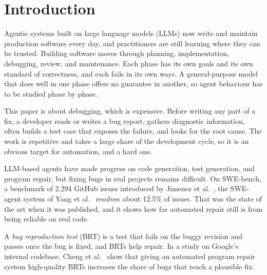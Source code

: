 \section{Introduction}
\label{sec:introduction}

Agentic systems built on large language models (LLMs) now write and maintain
production software every day, and practitioners are still learning where they
can be trusted. Building software moves through planning, implementation,
debugging, review, and maintenance. Each phase has its own goals and its own
standard of correctness, and each fails in its own ways. A general-purpose
model that does well in one phase offers no guarantee in another, so agent
behaviour has to be studied phase by phase.

This paper is about debugging, which is expensive. Before writing any part of
a fix, a developer reads or writes a bug report, gathers diagnostic
information, often builds a test case that exposes the failure, and looks for
the root cause. The work is repetitive and takes a large share of the
development cycle, so it is an obvious target for automation, and a hard one.

LLM-based agents have made progress on code generation, test generation, and
program repair, but fixing bugs in real projects remains difficult. On
SWE-bench, a benchmark of 2,294 GitHub issues introduced by Jimenez
et al.~\cite{Jimenez2023SWEbench}, the SWE-agent system of Yang
et al.~\cite{Yang2024SWEagent} resolves about 12.5\% of issues. That was the
state of the art when it was published, and it shows how far automated repair
still is from being reliable on real code.

A \emph{bug reproduction test} (BRT) is a test that fails on the buggy
revision and passes once the bug is fixed, and BRTs help repair. In a study on
Google's internal codebase, Cheng et al.~\cite{Cheng2025Agentic} show that
giving an automated program repair system high-quality BRTs increases the
share of bugs that reach a plausible fix.

